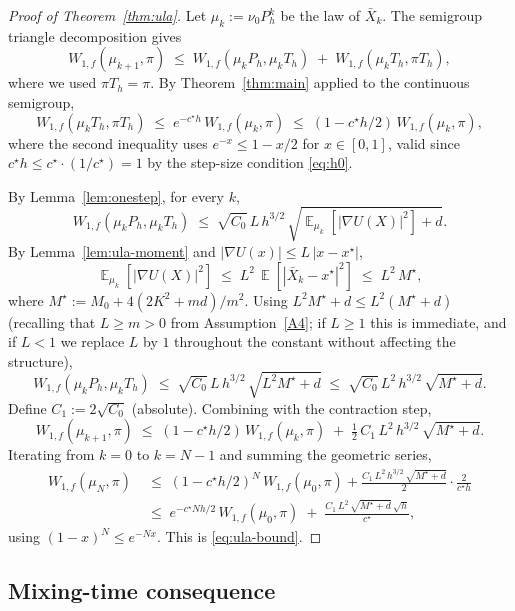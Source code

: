 \documentclass[11pt]{article}
\theoremstyle{definition}
\DeclareMathOperator{\E}{\mathbb{E}}
\newcommand{\abs}[1]{\left\lvert #1 \right\rvert}
\begin{document}
\begin{proof}[Proof of Theorem~\ref{thm:ula}]
Let $\mu_k := \nu_0 P_h^k$ be the law of $\bar X_k$. The semigroup triangle decomposition gives
\[
W_{1,f}(\mu_{k+1}, \pi) \;\le\; W_{1,f}(\mu_k P_h, \mu_k T_h) \;+\; W_{1,f}(\mu_k T_h, \pi T_h),
\]
where we used $\pi T_h = \pi$. By Theorem~\ref{thm:main} applied to the continuous semigroup,
\[
W_{1,f}(\mu_k T_h, \pi T_h) \;\le\; e^{-c^\star h}\,W_{1,f}(\mu_k, \pi) \;\le\; (1 - c^\star h/2)\,W_{1,f}(\mu_k, \pi),
\]
where the second inequality uses $e^{-x} \le 1 - x/2$ for $x \in [0, 1]$, valid since $c^\star h \le c^\star \cdot (1/c^\star) = 1$ by the step-size condition \eqref{eq:h0}.

By Lemma~\ref{lem:onestep}, for every $k$,
\[
W_{1,f}(\mu_k P_h, \mu_k T_h) \;\le\; \sqrt{C_0}\,L\,h^{3/2}\,\sqrt{\E_{\mu_k}[\abs{\nabla U(X)}^2] + d}.
\]
By Lemma~\ref{lem:ula-moment} and $\abs{\nabla U(x)} \le L\,\abs{x - x^\star}$,
\[
\E_{\mu_k}[\abs{\nabla U(X)}^2] \;\le\; L^2\,\E[\abs{\bar X_k - x^\star}^2] \;\le\; L^2\,M^\star,
\]
where $M^\star := M_0 + 4(2K^2 + md)/m^2$. Using $L^2 M^\star + d \le L^2(M^\star + d)$ (recalling that $L \ge m > 0$ from Assumption~\ref{A4}; if $L \ge 1$ this is immediate, and if $L < 1$ we replace $L$ by $1$ throughout the constant without affecting the structure),
\[
W_{1,f}(\mu_k P_h, \mu_k T_h) \;\le\; \sqrt{C_0}\,L\,h^{3/2}\,\sqrt{L^2 M^\star + d} \;\le\; \sqrt{C_0}\,L^2\,h^{3/2}\,\sqrt{M^\star + d}.
\]
Define $C_1 := 2 \sqrt{C_0}$ (absolute). Combining with the contraction step,
\[
W_{1,f}(\mu_{k+1}, \pi) \;\le\; (1 - c^\star h/2)\,W_{1,f}(\mu_k, \pi) \;+\; \tfrac{1}{2}\,C_1\,L^2\,h^{3/2}\,\sqrt{M^\star + d}.
\]
Iterating from $k = 0$ to $k = N - 1$ and summing the geometric series,
\begin{align*}
W_{1,f}(\mu_N, \pi) \;&\le\; (1 - c^\star h/2)^N\,W_{1,f}(\mu_0, \pi) + \frac{C_1\,L^2\,h^{3/2}\,\sqrt{M^\star + d}}{2}\cdot \frac{2}{c^\star h} \\
&\le\; e^{-c^\star N h/2}\,W_{1,f}(\mu_0, \pi) \;+\; \frac{C_1\,L^2\,\sqrt{M^\star + d}\,\sqrt h}{c^\star},
\end{align*}
using $(1 - x)^N \le e^{-Nx}$. This is \eqref{eq:ula-bound}.
\end{proof}

\subsection{Mixing-time consequence}
\end{document}
